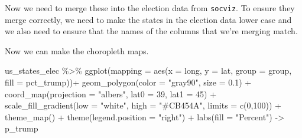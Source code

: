 \documentclass[
  letterpaper,
]{book}
\newenvironment{Shaded}{\begin{snugshade}}{\end{snugshade}}
\newcommand{\AttributeTok}[1]{\textcolor[rgb]{0.40,0.45,0.13}{#1}}
\newcommand{\CommentTok}[1]{\textcolor[rgb]{0.37,0.37,0.37}{#1}}
\newcommand{\DecValTok}[1]{\textcolor[rgb]{0.68,0.00,0.00}{#1}}
\newcommand{\FloatTok}[1]{\textcolor[rgb]{0.68,0.00,0.00}{#1}}
\newcommand{\FunctionTok}[1]{\textcolor[rgb]{0.28,0.35,0.67}{#1}}
\newcommand{\NormalTok}[1]{\textcolor[rgb]{0.00,0.23,0.31}{#1}}
\newcommand{\OtherTok}[1]{\textcolor[rgb]{0.00,0.23,0.31}{#1}}
\newcommand{\SpecialCharTok}[1]{\textcolor[rgb]{0.37,0.37,0.37}{#1}}
\newcommand{\StringTok}[1]{\textcolor[rgb]{0.13,0.47,0.30}{#1}}
\begin{document}
Now we need to merge these into the election data from \texttt{socviz}.
To ensure they merge correctly, we need to make the states in the
election data lower case and we also need to ensure that the names of
the columns that we're merging match.

\begin{Shaded}
\end{Shaded}

Now we can make the choropleth maps.

\begin{Shaded}
\begin{Highlighting}[]
\NormalTok{us\_states\_elec }\SpecialCharTok{\%\textgreater{}\%}
  \FunctionTok{ggplot}\NormalTok{(}\AttributeTok{mapping =} \FunctionTok{aes}\NormalTok{(}\AttributeTok{x =}\NormalTok{ long, }
                       \AttributeTok{y =}\NormalTok{ lat,}
                       \AttributeTok{group =}\NormalTok{ group,}
                       \AttributeTok{fill =}\NormalTok{ pct\_trump))}\SpecialCharTok{+}
  \FunctionTok{geom\_polygon}\NormalTok{(}\AttributeTok{color =} \StringTok{"gray90"}\NormalTok{, }\AttributeTok{size =} \FloatTok{0.1}\NormalTok{) }\SpecialCharTok{+}
  \FunctionTok{coord\_map}\NormalTok{(}\AttributeTok{projection =} \StringTok{"albers"}\NormalTok{, }
            \AttributeTok{lat0 =} \DecValTok{39}\NormalTok{, }
            \AttributeTok{lat1 =} \DecValTok{45}\NormalTok{) }\SpecialCharTok{+} 
  \FunctionTok{scale\_fill\_gradient}\NormalTok{(}\AttributeTok{low =} \StringTok{"white"}\NormalTok{, }
                      \AttributeTok{high =} \StringTok{"\#CB454A"}\NormalTok{,}
                      \AttributeTok{limits =} \FunctionTok{c}\NormalTok{(}\DecValTok{0}\NormalTok{,}\DecValTok{100}\NormalTok{)) }\SpecialCharTok{+} 
  \FunctionTok{theme\_map}\NormalTok{() }\SpecialCharTok{+} 
  \FunctionTok{theme}\NormalTok{(}\AttributeTok{legend.position =} \StringTok{"right"}\NormalTok{) }\SpecialCharTok{+} 
  \FunctionTok{labs}\NormalTok{(}\AttributeTok{fill =} \StringTok{"Percent"}\NormalTok{) }\OtherTok{{-}\textgreater{}}\NormalTok{ p\_trump}
\end{Highlighting}
\end{Shaded}
\end{document}
